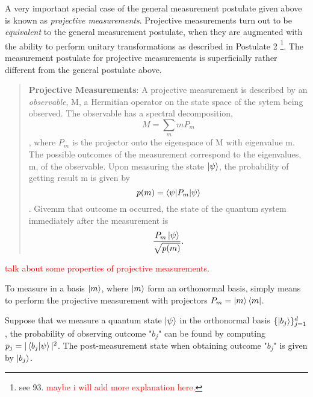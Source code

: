 A very important special case of the general measurement postulate given above is known as \textit{projective measurements}. Projective measurements turn out to be \textit{equivalent} to the general measurement postulate, when they are augmented with the ability to perform unitary transformations as described in Postulate 2 \footnote{see \cite{Wehner:notes} 93. \textcolor{red}{maybe i will add more explanation here.}}. The measurement postulate for projective measurements is superficially rather different from the general postulate above.
\begin{quote}
    \textbf{Projective Measurements}: A projective measurement is described by an \textit{observable}, M, a Hermitian operator on the state space of the sytem being observed. The observable has a spectral decomposition,
    \begin{equation}
        M=\sum_m m P_m
    \end{equation},
    where $P_m$ is the projector onto the eigenspace of M with eigenvalue m. The possible outcomes of the measurement correspond to the eigenvalues, m, of the observable. Upon measuring the state $\ket{\psi}$, the probability of getting result m is given by 
    \begin{equation}
        p(m)=\braket{\psi|P_m|\psi}
    \end{equation}.
    Givemm that outcome m occurred, the state of the quantum system immediately after the measurement is 
    \begin{equation}
        \frac{P_m \ket{\psi}}{\sqrt{p(m)}}.
    \end{equation}
\end{quote}

\bigskip
\textcolor{red}{talk about some properties of projective measurements}.

To measure in a basis $\ket{m}$, where $\ket{m}$ form an orthonormal basis, simply means to perform the projective measurement with projectors $P_m=\ket{m}\bra{m}$.

 Suppose that we measure a quantum state $\ket{\psi}$ in the orthonormal basis $\{\ket{b_j}\}_{j=1}^d$, the probability of observing outcome "$b_j$" can be found by computing $p_j=|\braket{b_j|\psi}|^2$. The post-measurement state when obtaining outcome "$b_j$" is given by $\ket{b_j}$.


